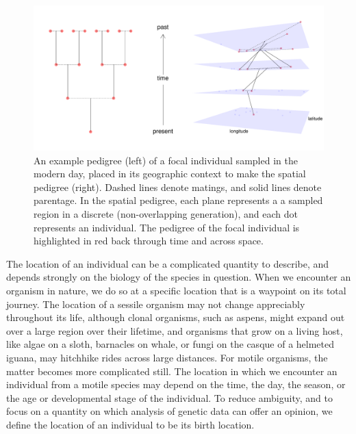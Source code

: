 \documentclass{ar-1col}
\begin{document}
\begin{figure}[h]
    \centering
         \includegraphics[width=\linewidth]{figs/spatial_pedigree.pdf}
        \caption{
		An example pedigree (left) of a focal individual sampled in the modern day, 
	   	placed in its geographic context to make the spatial pedigree (right).
		Dashed lines denote matings, and solid lines denote parentage.
		In the spatial pedigree, 
		each plane represents a a sampled region in a discrete (non-overlapping generation),
		and each dot represents an individual.
		The pedigree of the focal individual is highlighted in red 
		back through time and across space.
        }
        \label{spatial_pedigree}
\end{figure}

The location of an individual can be a complicated quantity to describe,
and depends strongly on the biology of the species in question.
When we encounter an organism in nature,
we do so at a specific location
that is a waypoint on its total journey.
The location of a sessile organism
may not change appreciably throughout its life,
although clonal organisms,
such as aspens,
might expand out over a large region over their lifetime,
and organisms that grow on a living host,
like algae on a sloth,
barnacles on whale,
or fungi on the casque of a helmeted iguana,
may hitchhike rides across large distances.
For motile organisms,
the matter becomes more complicated still.
The location in which we encounter an individual
from a motile species may depend
on the time, the day, the season,
or the age or developmental stage of the individual.
To reduce ambiguity,
and to focus on a quantity
on which analysis of genetic data can offer an opinion,
we define the location of an individual to be its birth location.
\end{document}
